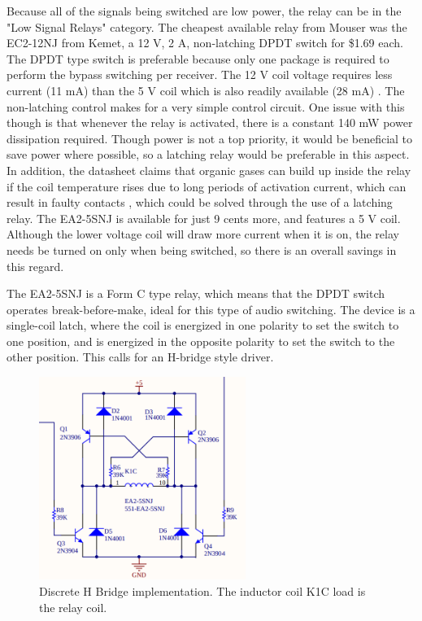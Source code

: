 \documentclass{article}
\begin{document}
		Because all of the signals being switched are low power, the relay can be in the "Low Signal Relays" category.  The cheapest available relay from Mouser was the EC2-12NJ from Kemet, a 12 V, 2 A, non-latching DPDT switch for \$1.69 each.  The DPDT type switch is preferable because only one package is required to perform the bypass switching per receiver.  The 12 V coil voltage requires less current (11 mA) than the 5 V coil which is also readily available (28 mA) \cite{EC2datasheet}.  The non-latching control makes for a very simple control circuit.  One issue with this though is that whenever the relay is activated, there is a constant 140 mW power dissipation required.  Though power is not a top priority, it would be beneficial to save power where possible, so a latching relay would be preferable in this aspect.  In addition, the datasheet claims that organic gases can build up inside the relay if the coil temperature rises due to long periods of activation current, which can result in faulty contacts \cite{EA2datasheet}, which could be solved through the use of a latching relay.  The EA2-5SNJ is available for just 9 cents more, and features a 5 V coil.  Although the lower voltage coil will draw more current when it is on, the relay needs be turned on only when being switched, so there is an overall savings in this regard.

		The EA2-5SNJ is a Form C type relay, which means that the DPDT switch operates break-before-make, ideal for this type of audio switching.  The device is a single-coil latch, where the coil is energized in one polarity to set the switch to one position, and is energized in the opposite polarity to set the switch to the other position.  This calls for an H-bridge style driver.

		\begin{figure}
			\centering
			\includegraphics[width = 0.6\textwidth]{PR2Images/DiscreteHBridge.png}
			\caption{Discrete H Bridge implementation.  The inductor coil K1C load is the relay coil.}
			\label{fig:DiscreteHBridge}
		\end{figure}
\end{document}
